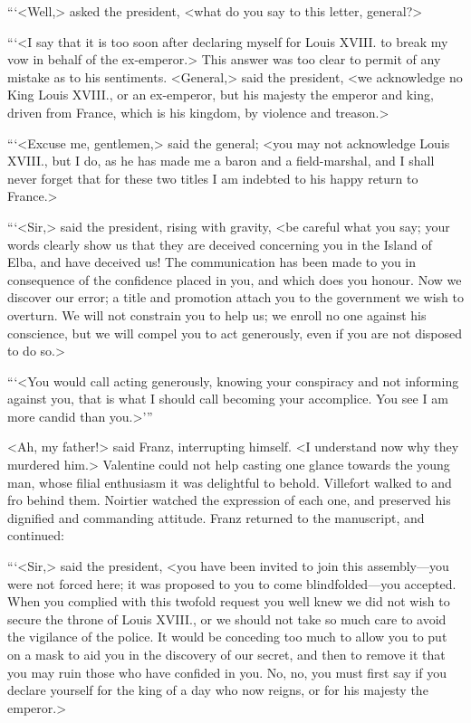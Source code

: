  “‘<Well,> asked the president, <what do you say to this letter, general?> 

 “‘<I say that it is too soon after declaring myself for Louis XVIII. to break my vow in behalf of the ex-emperor.> This answer was too clear to permit of any mistake as to his sentiments. <General,> said the president, <we acknowledge no King Louis XVIII., or an ex-emperor, but his majesty the emperor and king, driven from France, which is his kingdom, by violence and treason.> 

 “‘<Excuse me, gentlemen,> said the general; <you may not acknowledge Louis XVIII., but I do, as he has made me a baron and a field-marshal, and I shall never forget that for these two titles I am indebted to his happy return to France.> 

 “‘<Sir,> said the president, rising with gravity, <be careful what you say; your words clearly show us that they are deceived concerning you in the Island of Elba, and have deceived us! The communication has been made to you in consequence of the confidence placed in you, and which does you honour. Now we discover our error; a title and promotion attach you to the government we wish to overturn. We will not constrain you to help us; we enroll no one against his conscience, but we will compel you to act generously, even if you are not disposed to do so.> 

 “‘<You would call acting generously, knowing your conspiracy and not informing against you, that is what I should call becoming your accomplice. You see I am more candid than you.>'” 

 <Ah, my father!> said Franz, interrupting himself. <I understand now why they murdered him.> Valentine could not help casting one glance towards the young man, whose filial enthusiasm it was delightful to behold. Villefort walked to and fro behind them. Noirtier watched the expression of each one, and preserved his dignified and commanding attitude. Franz returned to the manuscript, and continued: 

 “‘<Sir,> said the president, <you have been invited to join this assembly—you were not forced here; it was proposed to you to come blindfolded—you accepted. When you complied with this twofold request you well knew we did not wish to secure the throne of Louis XVIII., or we should not take so much care to avoid the vigilance of the police. It would be conceding too much to allow you to put on a mask to aid you in the discovery of our secret, and then to remove it that you may ruin those who have confided in you. No, no, you must first say if you declare yourself for the king of a day who now reigns, or for his majesty the emperor.> 

